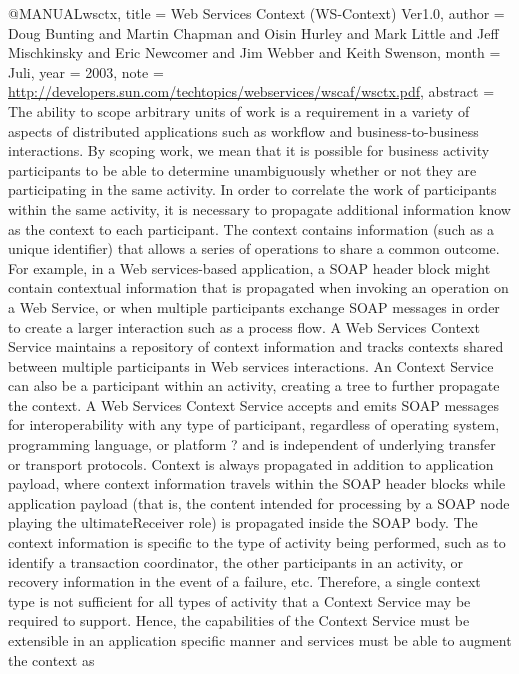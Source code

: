 @MANUAL{wsctx,
  title = {{Web Services Context (WS-Context) Ver1.0}},
  author = {Doug Bunting and Martin Chapman and Oisin Hurley and Mark Little
	and Jeff Mischkinsky and Eric Newcomer and Jim Webber and Keith Swenson},
  month = {Juli},
  year = {2003},
  note = {\url{http://developers.sun.com/techtopics/webservices/wscaf/wsctx.pdf}},
  abstract = {The ability to scope arbitrary units of work is a requirement in a
variety
	of aspects of distributed applications such as workflow and
business-to-business
	interactions. By scoping work, we mean that it is possible for
business
	activity participants to be able to determine unambiguously
whether
	or not they are participating in the same activity. In order to
correlate
	the work of participants within the same activity, it is
necessary
	to propagate additional information know as the context to
each participant.
	The context contains information (such as a unique
identifier) that
	allows a series of operations to share a common
outcome. For example,
	in a Web services-based application, a SOAP header
block might contain
	contextual information that is propagated when
invoking an operation
	on a Web Service, or when multiple participants
exchange SOAP messages
	in order to create a larger interaction such as a
process flow. A
	Web Services Context Service maintains a repository
of context information
	and tracks contexts shared between multiple
participants in Web services
	interactions. An Context Service can also be a
participant within
	an activity, creating a tree to further propagate the
context. A
	Web Services Context Service accepts and emits SOAP messages
for
	interoperability with any type of participant, regardless of
operating
	system, programming language, or platform ? and is independent
of
	underlying transfer or transport protocols. Context is always
propagated
	in addition to application payload, where context information
travels
	within the SOAP header blocks while application payload (that
is,
	the content intended for processing by a SOAP node playing the
ultimateReceiver
	role) is propagated inside the SOAP body. The context
information
	is specific to the type of activity being performed, such as to
identify
	a transaction coordinator, the other participants in an
activity,
	or recovery information in the event of a failure, etc.
Therefore,
	a single context type is not sufficient for all types of
activity
	that a Context Service may be required to support. Hence, the
capabilities
	of the Context Service must be extensible in an application
specific
	manner and services must be able to augment the context as
}}

